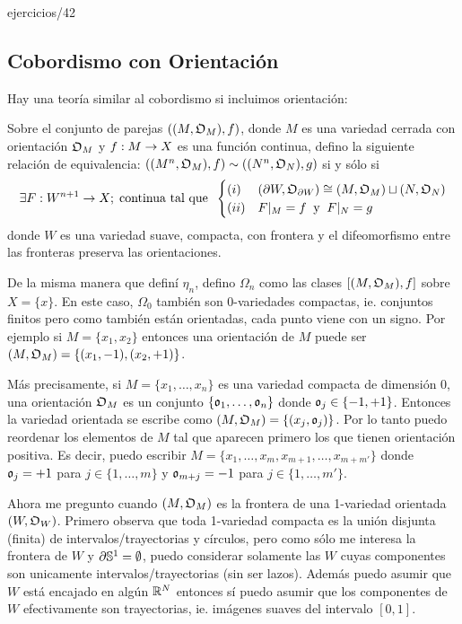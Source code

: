 \documentclass[../../topologia_algebraica]{subfiles}
\begin{document}
{ejercicios/42} %

\subsection{Cobordismo con Orientaci\'on}

Hay una teor\'ia similar al cobordismo si incluimos orientaci\'on:

\begin{defin}
  Sobre el conjunto de parejas $((M,\mathfrak{O}_M),f)$, donde $M$ es una variedad cerrada con orientaci\'on
  $\mathfrak{O}_M$ y $f:M\rightarrow X$ es una funci\'on continua, defino la siguiente relaci\'on
  de equivalencia: $((M^n,\mathfrak{O}_M),f)\sim((N^n,\mathfrak{O}_N),g)$ si y s\'olo si
  \[
    \exists F:W^{n+1}\rightarrow X;\;\text{continua tal que}\;\;
    \begin{cases}
      (i)& (\partial W,\mathfrak{O}_{\partial W})\cong (M,\mathfrak{O}_M)\sqcup (N,\mathfrak{O}_N) \\
      (ii)& F|_{M}=f \;\;\text{y}\;\; F|_{N}=g
    \end{cases}
  \]
  donde $W$ es una variedad suave, compacta, con frontera y el difeomorfismo entre las fronteras
  preserva las orientaciones.
\end{defin}

De la misma manera que defin\'i $\eta_n$, defino $\Omega_n$ como las clases $[(M,\mathfrak{O}_M),f]$ sobre
$X=\{x\}$. En este caso, $\Omega_0$ tambi\'en son 0-variedades compactas, ie. conjuntos finitos
pero como tambi\'en est\'an orientadas, cada punto viene con un signo. Por ejemplo si $M=\{x_1,x_2\}$
entonces una orientaci\'on de $M$ puede ser $(M,\mathfrak{O}_M)=\{(x_1,-1),(x_2,+1)\}$.

M\'as precisamente, si $M=\{x_1,\ldots,x_n\}$ es una variedad compacta de dimensi\'on 0, una
orientaci\'on $\mathfrak{O}_M$ es un conjunto $\{\mathfrak{o}_1,\ldots,\mathfrak{o}_n\}$ donde $\mathfrak{o}_j\in\{-1,+1\}$. Entonces
la variedad orientada se escribe como $(M,\mathfrak{O}_M)=\{(x_j,\mathfrak{o}_j)\}$. Por lo tanto puedo reordenar
los elementos de $M$ tal que aparecen primero los que tienen orientaci\'on positiva. Es decir,
puedo escribir $M=\{x_1,\ldots,x_m,x_{m+1},\ldots,x_{m+m'}\}$ donde $\mathfrak{o}_j=+1$ para $j\in\{1,\ldots,m\}$
y $\mathfrak{o}_{m+j}=-1$ para $j\in\{1,\ldots,m'\}$.

Ahora me pregunto cuando $(M,\mathfrak{O}_M)$ es la frontera de una 1-variedad orientada $(W,\mathfrak{O}_W)$.
Primero observa que toda 1-variedad compacta es la uni\'on disjunta (finita) de
intervalos/trayectorias y c\'irculos, pero como s\'olo me interesa la frontera de $W$ y
$\partial\mathbb{S}^1=\emptyset$, puedo considerar solamente las $W$ cuyas componentes son unicamente
intervalos/trayectorias (sin ser lazos). Adem\'as puedo asumir que $W$ est\'a encajado en alg\'un
$\mathbb{R}^N$ entonces s\'i puedo asumir que los componentes de $W$ efectivamente son trayectorias,
ie. im\'agenes suaves del intervalo $[0,1]$.
\end{document}
